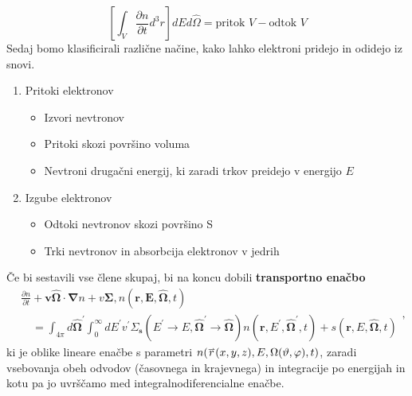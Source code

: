\documentclass[slovene,11pt,a4paper]{article}
\def\phi{\varphi}
\def\theta{\vartheta}
\renewcommand{\vec}[1]{\overset{\smash{\hbox{\raise -0.42ex\hbox{$\scriptscriptstyle\rightharpoonup$}}}}{#1}}
\begin{document}
\begin{equation}
\left[\int_{V} \frac{\partial n}{\partial t} d^{3} r\right] d E d \hat{\Omega}=\text {pritok } V-\text {odtok } V
\label{Angular_volume}
\end{equation}
Sedaj bomo klasificirali različne načine, kako lahko elektroni pridejo in odidejo iz snovi.
\begin{enumerate}
    \item Pritoki elektronov
    \begin{itemize}
        \item Izvori nevtronov
        \item Pritoki skozi površino voluma
        \item Nevtroni drugačni energij, ki zaradi trkov preidejo v energijo $E$
    \end{itemize}
    \item Izgube elektronov
    \begin{itemize}
        \item Odtoki nevtronov skozi površino S
        \item Trki nevtronov in absorbcija elektronov v jedrih
    \end{itemize}
\end{enumerate}
Če bi sestavili vse člene skupaj, bi na koncu dobili \textbf{transportno enačbo}
\begin{equation}
\begin{aligned}
&\frac{\partial n}{\partial t}+\boldsymbol{v} \hat{\boldsymbol{\Omega}} \cdot \boldsymbol{\nabla} n+v \boldsymbol{\Sigma}, n(\mathbf{r}, \boldsymbol{E}, \hat{\boldsymbol{\Omega}}, t) \\
&\quad=\int_{4 \pi} d \hat{\boldsymbol{\Omega}}^{\prime} \int_{0}^{\infty} d E^{\prime} v^{\prime} \Sigma_{\mathbf{s}}\left(E^{\prime} \rightarrow E, \hat{\boldsymbol{\Omega}}^{\prime} \rightarrow \hat{\boldsymbol{\Omega}}\right) n\left(\mathbf{r}, E^{\prime}, \hat{\boldsymbol{\Omega}}^{\prime}, t\right)+s(\mathbf{r}, E, \hat{\boldsymbol{\Omega}}, t)
\end{aligned},
\label{Transportna enačba}
\end{equation}
ki je oblike lineare enačbe s parametri $n(\vec{r}(x,y,z),E,\Omega(\theta,\phi), t)$, zaradi vsebovanja obeh odvodov (časovnega in krajevnega) in integracije po energijah in kotu pa jo uvrščamo med integralnodiferencialne enačbe.
\end{document}
